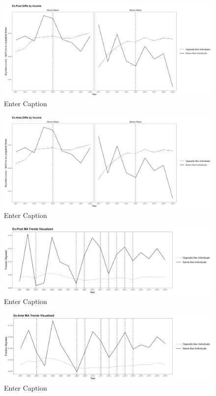 \documentclass[12pt,letterpaper]{article}
\begin{document}
\begin{figure}
    \centering
    \includegraphics[width=0.75\linewidth]{outputs/summary_stats/inc_post_diffs.png}
    \caption{Enter Caption}
    \label{fig: fig:enter-label}
\end{figure}

\begin{figure}
    \centering
    \includegraphics[width=0.75\linewidth]{outputs/summary_stats/inc_ante_diffs.png}
    \caption{Enter Caption}
    \label{fig: fig:enter-label}
\end{figure}

\begin{figure}
    \centering
    \includegraphics[width=0.75\linewidth]{outputs/summary_stats/MA_post_trends.png}
    \caption{Enter Caption}
    \label{fig: MA_post_trends}
\end{figure}

\begin{figure}
    \centering
    \includegraphics[width=0.75\linewidth]{outputs/summary_stats/MA_ante_trends.png}
    \caption{Enter Caption}
    \label{fig: MA_ante_trends}
\end{figure}
\end{document}
